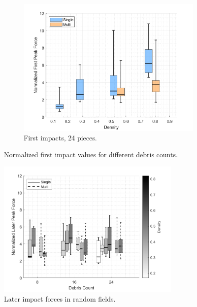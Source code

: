 \documentclass{article}
\begin{document}
\begin{figure}[htbp]
\begin{subfigure}[b]{0.32\textwidth}
        \centering
        \includegraphics[width=\textwidth]{Boxplot_Density_vs_PeakValues_24Debris.png}
        \caption{First impacts, 24 pieces.}
        \label{fig:boxplot_24}
    \end{subfigure}
    \caption{Normalized first impact values for different debris counts.}
    \label{fig:boxplots_side_by_side}
\end{figure}

\begin{figure}[htbp]
    \centering
    \includegraphics[width=0.8\textwidth]{Later_Peak_Random_Single_vs_Multi_ByDensityGradient.png}
    \caption{Later impact forces in random fields.}
    \label{fig:random_peaks_later}
\end{figure}
\end{document}
